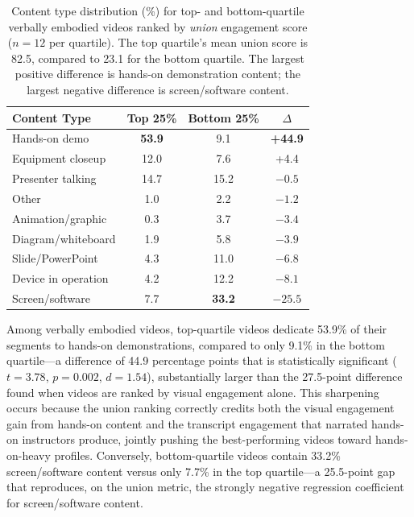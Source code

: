 \documentclass[fleqn,10pt]{wlscirep}
\begin{document}
\begin{table}[ht]
    \centering
    \caption{Content type distribution (\%) for top- and bottom-quartile verbally embodied videos ranked by \emph{union} engagement score ($n = 12$ per quartile). The top quartile's mean union score is 82.5, compared to 23.1 for the bottom quartile. The largest positive difference is hands-on demonstration content; the largest negative difference is screen/software content.}
    \label{tab:top_bottom}
    \begin{tabular}{lccc}
        \toprule
        Content Type & Top 25\% & Bottom 25\% & $\Delta$ \\
        \midrule
        Hands-on demo & \textbf{53.9} & 9.1 & \textbf{+44.9} \\
        Equipment closeup & 12.0 & 7.6 & +4.4 \\
        Presenter talking & 14.7 & 15.2 & $-0.5$ \\
        Other & 1.0 & 2.2 & $-1.2$ \\
        Animation/graphic & 0.3 & 3.7 & $-3.4$ \\
        Diagram/whiteboard & 1.9 & 5.8 & $-3.9$ \\
        Slide/PowerPoint & 4.3 & 11.0 & $-6.8$ \\
        Device in operation & 4.2 & 12.2 & $-8.1$ \\
        Screen/software & 7.7 & \textbf{33.2} & \textbf{$-25.5$} \\
        \bottomrule
    \end{tabular}
\end{table}

Among verbally embodied videos, top-quartile videos dedicate 53.9\% of their segments to hands-on demonstrations, compared to only 9.1\% in the bottom quartile---a difference of 44.9 percentage points that is statistically significant ($t = 3.78$, $p = 0.002$, $d = 1.54$), substantially larger than the 27.5-point difference found when videos are ranked by visual engagement alone. This sharpening occurs because the union ranking correctly credits both the visual engagement gain from hands-on content and the transcript engagement that narrated hands-on instructors produce, jointly pushing the best-performing videos toward hands-on-heavy profiles. Conversely, bottom-quartile videos contain 33.2\% screen/software content versus only 7.7\% in the top quartile---a 25.5-point gap that reproduces, on the union metric, the strongly negative regression coefficient for screen/software content.
\end{document}
